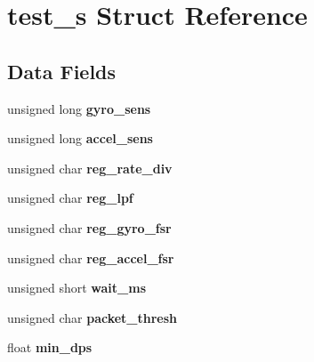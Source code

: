 \hypertarget{structtest__s}{}\section{test\+\_\+s Struct Reference}
\label{structtest__s}
\subsection*{Data Fields}
\begin{DoxyCompactItemize}
\item 
unsigned long {\bfseries gyro\+\_\+sens}\hypertarget{structtest__s_a32da1174cf6569aa99bdff70055bb45a}{}\label{structtest__s_a32da1174cf6569aa99bdff70055bb45a}

\item 
unsigned long {\bfseries accel\+\_\+sens}\hypertarget{structtest__s_a22a1d8ebbceb431baa0dfdc911fbc8ab}{}\label{structtest__s_a22a1d8ebbceb431baa0dfdc911fbc8ab}

\item 
unsigned char {\bfseries reg\+\_\+rate\+\_\+div}\hypertarget{structtest__s_a82f9074fa4cc93f3d21f826a9e739294}{}\label{structtest__s_a82f9074fa4cc93f3d21f826a9e739294}

\item 
unsigned char {\bfseries reg\+\_\+lpf}\hypertarget{structtest__s_a794ee75f43ca70e89a68b43642eb2c59}{}\label{structtest__s_a794ee75f43ca70e89a68b43642eb2c59}

\item 
unsigned char {\bfseries reg\+\_\+gyro\+\_\+fsr}\hypertarget{structtest__s_a6063bc7c719cdaddf88633b1148fd323}{}\label{structtest__s_a6063bc7c719cdaddf88633b1148fd323}

\item 
unsigned char {\bfseries reg\+\_\+accel\+\_\+fsr}\hypertarget{structtest__s_a08dc2a906129744a045950c3642a9023}{}\label{structtest__s_a08dc2a906129744a045950c3642a9023}

\item 
unsigned short {\bfseries wait\+\_\+ms}\hypertarget{structtest__s_a0abed830f8dc38c7bd17ce78ee2530d8}{}\label{structtest__s_a0abed830f8dc38c7bd17ce78ee2530d8}

\item 
unsigned char {\bfseries packet\+\_\+thresh}\hypertarget{structtest__s_aa8dbf099c1734ea67c1ef1938c0baec8}{}\label{structtest__s_aa8dbf099c1734ea67c1ef1938c0baec8}

\item 
float {\bfseries min\+\_\+dps}\hypertarget{structtest__s_a73ee82e1de6d3bdc4cc37282c012f0e1}{}\label{structtest__s_a73ee82e1de6d3bdc4cc37282c012f0e1}


\end{DoxyCompactItemize}
